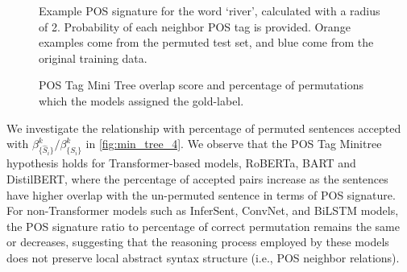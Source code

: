 \documentclass[letterpaper, 12pt]{report}
\begin{document}
\begin{figure}[ht]
    \centering
    \caption{Example POS signature for the word `river', calculated with a radius of 2. Probability of each neighbor POS tag is provided. Orange examples come from the permuted test set, and blue come from the original training data. }
    \label{fig:unli_pos_signature}
\end{figure}



\begin{figure}[t]
    \centering
    \caption{POS Tag Mini Tree overlap score and  percentage of permutations which the models assigned the gold-label.}
    \label{fig:min_tree_4}
\end{figure}

We investigate the relationship with percentage of permuted sentences accepted with $\beta^k_{\{\hat{S}_i\}} / \beta^k_{\{S_i\}}$ in \autoref{fig:min_tree_4}. We observe that the POS Tag Minitree hypothesis holds for Transformer-based models, RoBERTa, BART and DistilBERT, where the percentage of accepted pairs increase as the sentences have higher overlap with the un-permuted sentence in terms of POS signature. For non-Transformer models such as InferSent, ConvNet, and BiLSTM models, the POS signature ratio to percentage of correct permutation remains the same or decreases, suggesting that the reasoning process employed by these models does not preserve local abstract syntax structure (i.e., POS neighbor relations).
\end{document}
